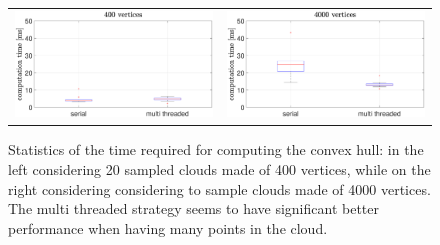 \documentclass{article}
\begin{document}
\begin{figure}
\begin{tabular}{cc}
\begin{minipage}[t]{0.5\textwidth}
\includegraphics[width = 0.99 \columnwidth]{./image/400_vertex_time.eps}
\end{minipage} 
&
\begin{minipage}[t]{0.5\textwidth}
\includegraphics[width = 0.99 \columnwidth]{./image/4000_vertex_time.eps}
\end{minipage} 
\end{tabular}
\caption{Statistics of the time required for computing the convex hull: in the left considering 20 sampled clouds made of 400 vertices, while on the right considering considering to sample clouds made of 4000 vertices. The multi threaded strategy seems to have significant better performance when having many points in the cloud. }
\label{fig:times}
\end{figure} 

 
\end{document}
